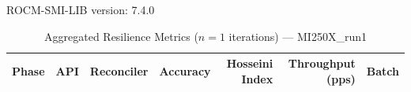 ROCM-SMI-LIB version: 7.4.0

\begin{table}[htbp]
\caption{Aggregated Resilience Metrics ($n=1$ iterations) --- MI250X_run1}
\begin{tabular}{l l l r r r r}
\hline
Phase & API & Reconciler & Accuracy & Hosseini Index & Throughput (pps) & Batch \\
\hline
\hline
\end{tabular}
\end{table}

